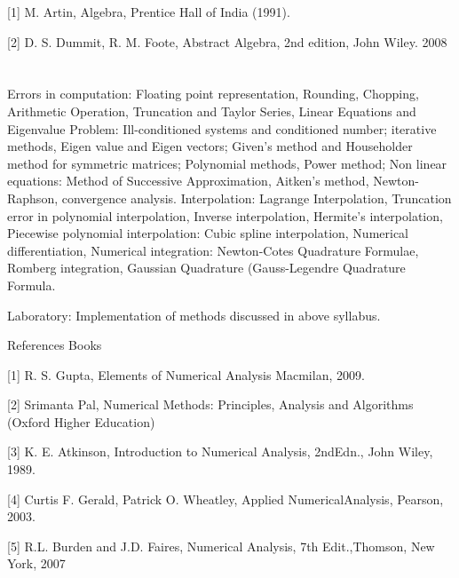 [1] M. Artin, Algebra, Prentice Hall of India (1991).  

[2] D. S. Dummit, R. M. Foote, Abstract Algebra, 2nd edition, John Wiley. 2008  

 

\section{\dsccourseinfo} 


 

Errors in computation: Floating point representation, Rounding, Chopping, Arithmetic Operation,  Truncation and Taylor Series, Linear Equations and Eigenvalue Problem:  Ill-conditioned systems and conditioned number;  iterative methods, Eigen value and Eigen vectors; Given’s method and Householder method for symmetric matrices; Polynomial methods, Power method; Non linear equations: Method of Successive Approximation, Aitken’s method, Newton-Raphson, convergence analysis. Interpolation:  Lagrange Interpolation, Truncation error in polynomial interpolation, Inverse interpolation,  Hermite's interpolation, Piecewise polynomial interpolation: Cubic spline interpolation, Numerical differentiation, Numerical integration:   Newton-Cotes Quadrature Formulae, Romberg integration, Gaussian Quadrature (Gauss-Legendre Quadrature Formula. 

Laboratory: Implementation of methods discussed in above syllabus. 

References Books 

[1] R. S. Gupta, Elements of Numerical Analysis Macmilan, 2009. 

[2] Srimanta Pal, Numerical Methods: Principles, Analysis and Algorithms (Oxford Higher Education) 

[3] K. E. Atkinson, Introduction to Numerical Analysis, 2ndEdn., John Wiley, 1989. 

[4] Curtis F. Gerald, Patrick O. Wheatley, Applied NumericalAnalysis, Pearson, 2003. 

[5] R.L. Burden and J.D. Faires, Numerical Analysis, 7th Edit.,Thomson, New York, 2007 

 

\section{\dsccourseinfo}

